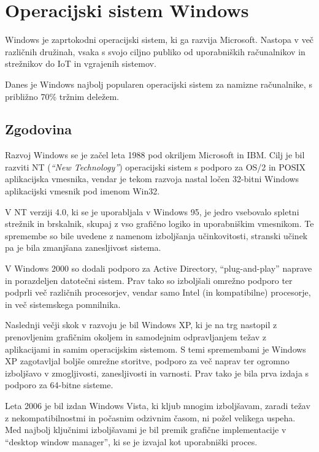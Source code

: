 \documentclass[a4paper,12pt,openright]{book}
\begin{document}
\section{Operacijski sistem Windows}

Windows je zaprtokodni operacijski sistem, ki ga razvija Microsoft.
Nastopa v več različnih družinah, vsaka s svojo ciljno publiko od uporabniških računalnikov in strežnikov do IoT in vgrajenih sistemov.

Danes je Windows najbolj popularen operacijski sistem za namizne računalnike, s približno 70\% tržnim deležem.

\subsection{Zgodovina}

Razvoj Windows se je začel leta 1988 pod okriljem Microsoft in IBM.
Cilj je bil razviti NT (\textit{``New Technology''}) operacijski sistem s podporo za OS/2 in POSIX aplikacijska vmesnika, vendar je tekom razvoja nastal ločen 32-bitni Windows aplikacijski vmesnik pod imenom Win32.

V NT verziji 4.0, ki se je uporabljala v Windows 95, je jedro vsebovalo spletni strežnik in brskalnik, skupaj z vso grafično logiko in uporabniškim vmesnikom.
Te spremembe so bile uvedene z namenom izboljšanja učinkovitosti, stranski učinek pa je bila zmanjšana zanesljivost sistema.

V Windows 2000 so dodali podporo za Active Directory, ``plug-and-play'' naprave in porazdeljen datotečni sistem.
Prav tako so izboljšali omrežno podporo ter podprli več različnih procesorjev, vendar samo Intel (in kompatibilne) procesorje, in več sistemskega pomnilnika.

Naslednji večji skok v razvoju je bil Windows XP, ki je na trg nastopil z prenovljenim grafičnim okoljem in samodejnim odpravljanjem težav z aplikacijami in samim operacijskim sistemom.
S temi spremembami je Windows XP zagotavljal boljše omrežne storitve, podporo za več naprav ter ogromno izboljšavo v zmogljivosti, zanesljivosti in varnosti.
Prav tako je bila prva izdaja s podporo za 64-bitne sisteme.

Leta 2006 je bil izdan Windows Vista, ki kljub mnogim izboljšavam, zaradi težav z nekompatibilnostmi in počasnim odzivnim časom, ni požel velikega uspeha.
Med najbolj ključnimi izboljšavami je bil premik grafične implementacije v ``desktop window manager'', ki se je izvajal kot uporabniški proces.
\end{document}
